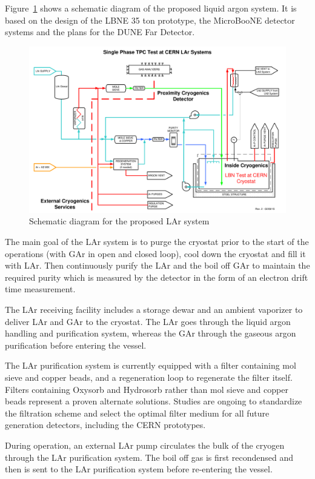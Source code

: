 Figure~\ref{fig:proposed-LAr-system} shows a schematic diagram of the proposed liquid argon system. It is based on the design of the 
LBNE 35 ton prototype, the MicroBooNE detector systems and the plans for the DUNE Far Detector.
\begin{figure}
\begin{center}
\includegraphics[width=1.0\textwidth]{figures/proposed-LAr-system} 
\caption[Schematic diagram for the proposed LAr system]{\label{fig:proposed-LAr-system} Schematic diagram for the proposed LAr system}
\end{center}
\end{figure}
The main goal of the LAr system is to purge the cryostat prior to the start of the operations (with GAr in open 
and closed loop), cool down the cryostat and fill it with LAr. Then continuously purify the LAr and the boil 
off GAr to maintain the required purity which is measured by the detector in the form of an electron drift time measurement.

The LAr receiving facility includes a storage dewar and an ambient vaporizer to deliver LAr and GAr to the 
cryostat. The LAr goes through the liquid argon handling and purification system, whereas the GAr 
through the gaseous argon purification before entering the vessel.

The LAr purification system is currently equipped with a filter containing mol sieve and copper beads, and 
a regeneration loop to regenerate the filter itself. Filters containing Oxysorb and Hydrosorb rather than 
mol sieve and copper beads represent a proven alternate solutions.
Studies are ongoing to standardize the filtration scheme and select the optimal filter medium for all 
future generation detectors, including the CERN prototypes. 

During operation, an external LAr pump circulates the bulk of the cryogen through the LAr purification 
system. The boil off gas is first recondensed and then is sent to the LAr purification system before 
re-entering the vessel.





